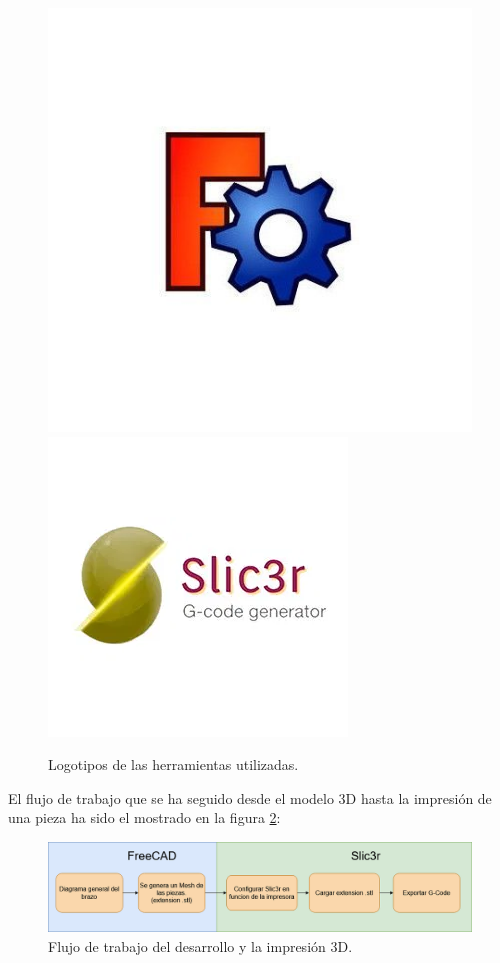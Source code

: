 \begin{figure}[H]
    \centering
    \includegraphics[width=.45\linewidth]{pictures/freeCAD.jpg}
    \hspace{1cm}
    \includegraphics[width=.45\linewidth]{pictures/slic3r_logo.jpg}
    \caption{Logotipos de las herramientas utilizadas.}
    \label{fig:herramientas_3d}
\end{figure}

El flujo de trabajo que se ha seguido desde el modelo 3D hasta la impresión de una pieza ha sido el mostrado en la figura \ref{fig:flujo_3d}:

\begin{figure}[H]
    \centering
    \includegraphics[width=.9\linewidth]{pictures/flujo_trabajo_impresion.png}
    \caption{Flujo de trabajo del desarrollo y la impresión 3D.}
    \label{fig:flujo_3d}
\end{figure}






